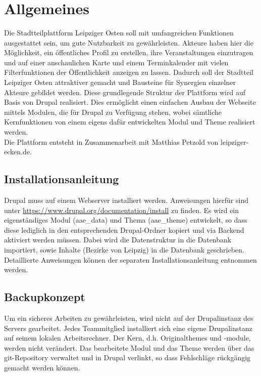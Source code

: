 \documentclass{swp}
\begin{document}
\\\\\\\\\\

\tableofcontents
\section{Allgemeines}
Die Stadtteilplattform Leipziger Osten soll mit umfangreichen Funktionen ausgestattet sein, um gute Nutzbarkeit zu gew\"ahrleisten. Akteure haben hier die M\"oglichkeit, ein \"offentliches Profil zu erstellen, ihre Veranstaltungen einzutragen und auf einer anschaulichen Karte und einem Terminkalender mit vielen Filterfunktionen der \"Offentlichkeit anzeigen zu lassen. Dadurch soll der Stadtteil Leipziger Osten attraktiver gemacht und Bausteine f\"ur Synergien einzelner Akteure gebildet werden. Diese grundlegende Struktur der Plattform wird auf Basis von Drupal realisiert. Dies erm\"oglicht einen einfachen Ausbau der Webseite mittels Modulen, die f\"ur Drupal zu Verf\"ugung stehen, wobei s\"amtliche Kernfunktionen von einem eigens daf\"ur entwickelten Modul und Theme realisiert werden.\\
Die Plattform entsteht in Zusammenarbeit mit Matthias Petzold von leipziger-ecken.de.
\subsection{Installationsanleitung}
Drupal muss auf einem Webserver installiert werden. Anweisungen hierf\"ur sind unter \url{https://www.drupal.org/documentation/install} zu finden. Es wird ein eigenst\"andiges Modul (aae\_{}data) und Thema (aae\_{}theme) entwickelt, so dass diese lediglich in den entsprechenden Drupal-Ordner kopiert und via Backend aktiviert werden m\"ussen. Dabei wird die Datenstruktur in die Datenbank importiert, sowie Inhalte (Bezirke von Leipzig) in die Datenbank geschrieben. \\
Detaillierte Anweisungen k\"onnen der separaten Installationsanleitung entnommen werden.
\subsection{Backupkonzept}
Um ein sicheres Arbeiten zu gew\"ahrleisten, wird nicht auf der Drupalinstanz des Servers gearbeitet. Jedes Teammitglied installiert sich eine eigene Drupalinstanz auf seinem lokalen Arbeitsrechner. Der Kern, d.h. Originalthemes und -module, werden nicht ver\"andert.  Das bearbeitete Modul und das Theme werden \"uber das git-Repository verwaltet und in Drupal verlinkt, so dass Fehlschl\"age r\"uckg\"angig gemacht werden k\"onnen.
\end{document}
